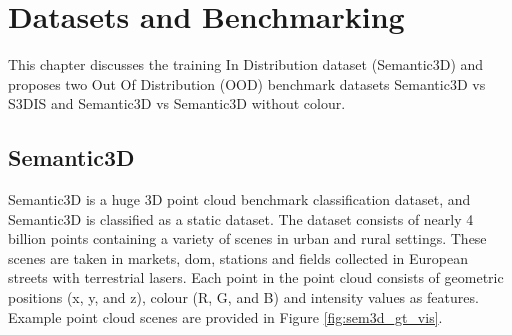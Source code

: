 

    \chapter{Datasets and Benchmarking}
    \label{ch:benchmark}
    This chapter discusses the training In Distribution dataset (Semantic3D) and proposes two Out Of Distribution (OOD) benchmark datasets Semantic3D vs S3DIS and Semantic3D vs Semantic3D without colour.
    \section{Semantic3D}
    Semantic3D is a huge 3D  point cloud benchmark classification dataset, and Semantic3D is classified as a static dataset.
    The dataset consists of nearly 4 billion points containing a variety of scenes in urban and rural settings.
    These scenes are taken in markets, dom, stations and fields collected in European streets with terrestrial lasers.
    Each point in the point cloud consists of geometric positions (x, y, and z), colour (R, G, and B) and intensity values as features.
    Example point cloud scenes are provided in Figure \ref{fig:sem3d_gt_vis}. 
    
